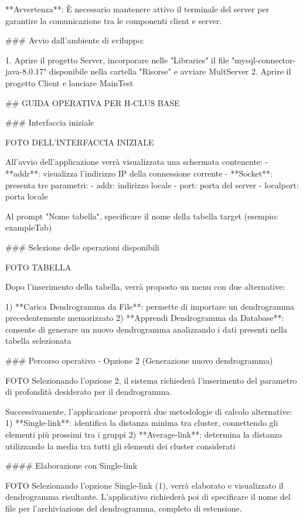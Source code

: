 **Avvertenza**: È necessario mantenere attivo il terminale del server per garantire la comunicazione tra le componenti client e server.

### Avvio dall'ambiente di sviluppo:

1. Aprire il progetto Server, incorporare nelle "Libraries" il file "mysql-connector-java-8.0.17" disponibile nella cartella "Risorse" e avviare MultServer
2. Aprire il progetto Client e lanciare MainTest

## GUIDA OPERATIVA PER H-CLUS BASE

### Interfaccia iniziale

 FOTO DELL'INTERFACCIA INIZIALE


All'avvio dell'applicazione verrà visualizzata una schermata contenente:
- **addr**: visualizza l'indirizzo IP della connessione corrente
- **Socket**: presenta tre parametri:
  - addr: indirizzo locale
  - port: porta del server
  - localport: porta locale

Al prompt "Nome tabella", specificare il nome della tabella target (esempio: exampleTab)

### Selezione delle operazioni disponibili

FOTO TABELLA 

Dopo l'inserimento della tabella, verrà proposto un menu con due alternative:

1) **Carica Dendrogramma da File**: permette di importare un dendrogramma precedentemente memorizzato
2) **Apprendi Dendrogramma da Database**: consente di generare un nuovo dendrogramma analizzando i dati presenti nella tabella selezionata

### Percorso operativo - Opzione 2 (Generazione nuovo dendrogramma)

FOTO
Selezionando l'opzione 2, il sistema richiederà l'inserimento del parametro di profondità desiderato per il dendrogramma.

Successivamente, l'applicazione proporrà due metodologie di calcolo alternative:
1) **Single-link**: identifica la distanza minima tra cluster, connettendo gli elementi più prossimi tra i gruppi
2) **Average-link**: determina la distanza utilizzando la media tra tutti gli elementi dei cluster considerati

#### Elaborazione con Single-link

FOTO 
Selezionando l'opzione Single-link (1), verrà elaborato e visualizzato il dendrogramma risultante. L'applicativo richiederà poi di specificare il nome del file per l'archiviazione del dendrogramma, completo di estensione.

